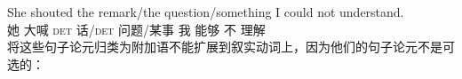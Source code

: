 \ea
\gll She shouted the remark/the question/something I could not understand.\\
她 大喊 \textsc{det} 话/\textsc{det} 问题/某事 我 能够 不 理解\\
\z
将这些句子论元归类为附加语不能扩展到叙实动词上，因为他们的句子论元不是可选的\citep[]{AG2008a}：

\eal
{}
\zl

